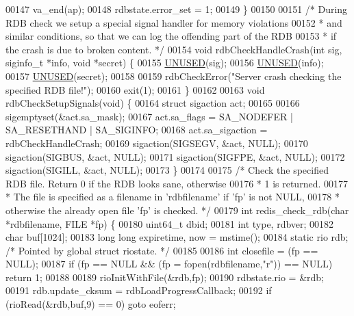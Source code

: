 \begin{DoxyCode}
{{{{{{{{00147     va\_end(ap);
00148     rdbstate.error\_set = 1;
00149 \}
00150 
00151 \textcolor{comment}{/* During RDB check we setup a special signal handler for memory violations}
00152 \textcolor{comment}{ * and similar conditions, so that we can log the offending part of the RDB}
00153 \textcolor{comment}{ * if the crash is due to broken content. */}
00154 \textcolor{keywordtype}{void} rdbCheckHandleCrash(\textcolor{keywordtype}{int} sig, siginfo\_t *info, \textcolor{keywordtype}{void} *secret) \{
00155     \hyperlink{server_8h_ae7c9dc8f13568a9c856573751f1ee1ec}{UNUSED}(sig);
00156     \hyperlink{server_8h_ae7c9dc8f13568a9c856573751f1ee1ec}{UNUSED}(info);
00157     \hyperlink{server_8h_ae7c9dc8f13568a9c856573751f1ee1ec}{UNUSED}(secret);
00158 
00159     rdbCheckError(\textcolor{stringliteral}{"Server crash checking the specified RDB file!"});
00160     exit(1);
00161 \}
00162 
00163 \textcolor{keywordtype}{void} rdbCheckSetupSignals(\textcolor{keywordtype}{void}) \{
00164     \textcolor{keyword}{struct} sigaction act;
00165 
00166     sigemptyset(&act.sa\_mask);
00167     act.sa\_flags = SA\_NODEFER | SA\_RESETHAND | SA\_SIGINFO;
00168     act.sa\_sigaction = rdbCheckHandleCrash;
00169     sigaction(SIGSEGV, &act, NULL);
00170     sigaction(SIGBUS, &act, NULL);
00171     sigaction(SIGFPE, &act, NULL);
00172     sigaction(SIGILL, &act, NULL);
00173 \}
00174 
00175 \textcolor{comment}{/* Check the specified RDB file. Return 0 if the RDB looks sane, otherwise}
00176 \textcolor{comment}{ * 1 is returned.}
00177 \textcolor{comment}{ * The file is specified as a filename in 'rdbfilename' if 'fp' is not NULL,}
00178 \textcolor{comment}{ * otherwise the already open file 'fp' is checked. */}
00179 \textcolor{keywordtype}{int} redis\_check\_rdb(\textcolor{keywordtype}{char} *rdbfilename, FILE *fp) \{
00180     uint64\_t dbid;
00181     \textcolor{keywordtype}{int} type, rdbver;
00182     \textcolor{keywordtype}{char} buf[1024];
00183     \textcolor{keywordtype}{long} \textcolor{keywordtype}{long} expiretime, now = mstime();
00184     \textcolor{keyword}{static} rio rdb; \textcolor{comment}{/* Pointed by global struct riostate. */}
00185 
00186     \textcolor{keywordtype}{int} closefile = (fp == NULL);
00187     \textcolor{keywordflow}{if} (fp == NULL && (fp = fopen(rdbfilename,\textcolor{stringliteral}{"r"})) == NULL) \textcolor{keywordflow}{return} 1;
00188 
00189     rioInitWithFile(&rdb,fp);
00190     rdbstate.rio = &rdb;
00191     rdb.update\_cksum = rdbLoadProgressCallback;
00192     \textcolor{keywordflow}{if} (rioRead(&rdb,buf,9) == 0) \textcolor{keywordflow}{goto} eoferr;
}}}}}}}}
\end{DoxyCode}
